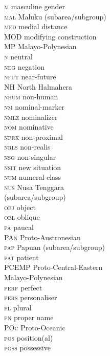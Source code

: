 \begin{multicols}{2}
\begin{tabbing}
 \textsc{m}  \> masculine gender \\
 \textsc{mal}  \> Maluku (subarea\slash subgroup) \\
 \textsc{med}  \> medial distance \\
 \textsc{MOD}  \> modifying construction \\
 \textsc{MP}  \> Malayo-Polynesian \\
 \textsc{n}  \> neutral \\
 \textsc{neg}  \> negation \\
 \textsc{nfut}  \> near-future \\
 \textsc{NH}  \> North Halmahera \\
 \textsc{nhum}  \> non-human \\
 \textsc{nm}  \> nominal-marker \\
 \textsc{nmlz}  \> nominalizer \\
 \textsc{nom}  \> nominative \\
 \textsc{nprx}  \> non-proximal \\
 \textsc{nrls}  \> non-realis \\
 \textsc{nsg}  \> non-singular \\
 \textsc{nsit}  \> new situation \\
 \textsc{num}  \> numeral class \\
 \textsc{nus}  \> Nusa Tenggara\\\> (subarea\slash subgroup) \\
 \textsc{obj}  \> object \\
 \textsc{obl}  \> oblique \\
 \textsc{pa}  \> paucal \\
 \textsc{PAn} \> Proto-Austronesian \\
 \textsc{pap}  \> Papuan (subarea\slash subgroup) \\
 \textsc{pat}  \> patient \\
 \textsc{PCEMP} \> Proto-Central-Eastern\\\> Malayo-Polynesian\\
 \textsc{perf}  \> perfect \\
 \textsc{pers}  \> personaliser \\
 \textsc{pl}  \> plural \\
 \textsc{pn}  \> proper name \\
 \textsc{POc} \> Proto-Oceanic \\
 \textsc{pos}  \> position(al) \\
 \textsc{poss}  \> possessive \\

\end{tabbing}
\end{multicols}
